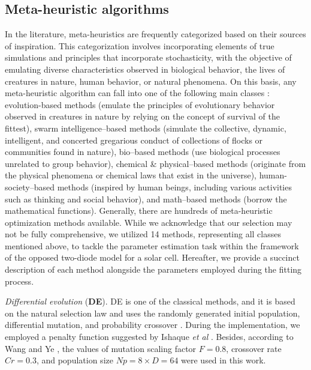 \documentclass[a4paper,fleqn]{cas-dc}
\begin{document}





\subsection{Meta-heuristic algorithms}\label{MHA}
In the literature, meta-heuristics are frequently categorized based on their sources of inspiration.
This categorization involves incorporating elements of true simulations and principles that incorporate stochasticity,
with the objective of emulating diverse characteristics observed in biological behavior, the lives of creatures in nature, human behavior, or natural phenomena.
On this basis, any meta-heuristic algorithm can fall into one of the following main classes \cite{WhiteShark,Gannet,Dandelion}:
evolution-based methods (emulate the principles of evolutionary behavior observed in creatures in nature by relying on the concept of survival of the fittest),
swarm intelligence--based methods (simulate the collective, dynamic, intelligent, and concerted gregarious conduct of collections of flocks or communities found in nature),
bio--based methods (use biological processes unrelated to group behavior),
chemical \& physical--based methods (originate from the physical phenomena or chemical laws that exist in the universe),
human-society--based methods (inspired by human beings, including various activities such as thinking and social behavior),
and math--based methods (borrow the mathematical functions).
Generally, there are hundreds of meta-heuristic optimization methods available.
While we acknowledge that our selection may not be fully comprehensive,
we utilized 14 methods, representing all classes mentioned above,
to tackle the parameter estimation task within the framework of the opposed two-diode model for a solar cell.
Hereafter, we provide a succinct description of each method alongside the parameters employed during the fitting process.

\emph{Differential evolution} (\textbf{DE}).
DE is one of the classical methods,
and  it is based on the natural selection law and uses the randomly generated initial population,
differential mutation, and probability crossover \cite{DEWang}.
During the implementation, we employed a penalty function suggested by Ishaque \emph{et al} \cite{P-DE_Ishaque}.
Besides, according to Wang and Ye \cite{DEWang}, the values of mutation scaling factor $F=0.8$,
crossover rate $C\!r=0.3$, and population size $N\!p=8\times D=64$ were used in this work.
\end{document}
